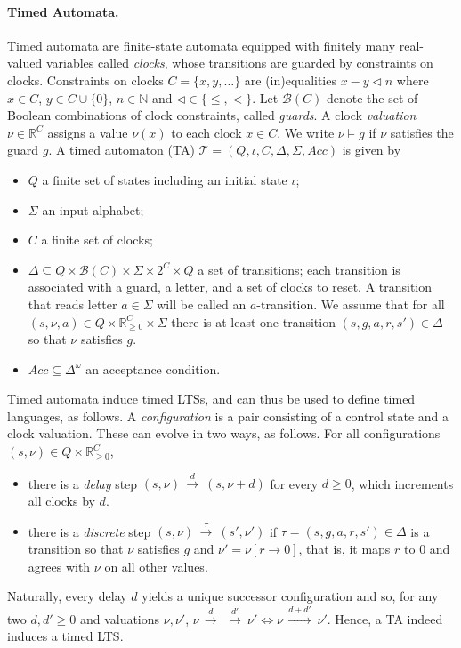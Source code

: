 \documentclass[10pt,a4paper]{amsart}
\theoremstyle{definition}
\numberwithin{equation}{section}
\newcommand{\R}{\mathbb{R}}
\newcommand{\nnreals}{{\mathbb R}_{\geq 0}}
\newcommand{\x}{\times}
\newcommand{\B}{\mathcal{B}}
\newcommand{\T}{\mathcal{T}}
\newcommand{\states}{Q}
\newcommand{\transitions}{\Delta}
\newcommand{\clocks}{C}
\newcommand{\valuations}{\nnreals^\clocks}
\newcommand{\acc}{\mathit{Acc}}
\newcommand{\TAtuple}{(\states,\iota,\clocks,\transitions,\Sigma,\acc)}
\newcommand{\step}[2][]{\Step{#2}{}{#1}}
\newcommand{\Step}[3]{\ensuremath{\,{\stackrel{#1}{\longrightarrow}}{}^{\scriptstyle{#2}}_{\scriptstyle{#3}}}\,}
\newcommand{\mypar}[1]{\paragraph*{#1.}}
\begin{document}
\medskip
\mypar{Timed Automata}
Timed automata are finite-state automata equipped with
finitely many real-valued variables called \emph{clocks}, whose transitions are guarded by constraints on clocks.
Constraints on clocks $\clocks=\{x,y,\ldots\}$ are (in)equalities $x-y \triangleleft n$ where $x\in \clocks$, $y\in \clocks\cup \{0\}$, $n\in \mathbb{N}$ and $\triangleleft \in \{\leq, <\}$. Let $\B(\clocks)$ denote the set of Boolean combinations of clock constraints, called \emph{guards}.
A clock \emph{valuation} $\nu\in \R^\clocks$ assigns a value $\nu(x)$ to each clock $x\in \clocks$. We write $\nu \models g$ if $\nu$ satisfies the guard $g$. 
A timed automaton (TA) $\T=\TAtuple$ is given by 
\begin{itemize}
\item $Q$ a finite set of states including an initial state $\iota$;
\item $\Sigma$ an input alphabet;
\item $\clocks$ a finite set of clocks;
\item $\transitions\subseteq Q\times \B(\clocks)\times \Sigma\times 2^\clocks \times Q$  a set of transitions; each transition is associated with a guard, a letter, and a set of clocks to reset. 
    A transition that reads letter $a\in\Sigma$ will be called an $a$-transition.
    We assume that %
    for all $(s,\nu,a)\in Q\x\valuations\x\Sigma$ there is at least one
    transition $(s,g,a,r,s')\in\transitions$
    so that $\nu$ satisfies $g$.
\item $\acc\subseteq \Delta^\omega$ an acceptance condition. 
\end{itemize}
Timed automata induce timed LTSs, and can thus be used to define timed languages, as follows.
A \emph{configuration} is a pair consisting of
a control state and a clock valuation.
These can evolve in two ways, as follows.
For all configurations $(s,\nu)\in \states\x\valuations$,
\begin{itemize}
    \item 
        there is a \emph{delay} step 
        $(s,\nu)\step{d}(s,\nu+d)$
        for every $d\ge0$, which increments all clocks by $d$.
    \item there is a \emph{discrete} step
        $(s,\nu)\step{\tau}(s',\nu')$ 
        if
        $\tau=(s,g,a,r,s')\in\transitions$
        is a transition so that $\nu$ satisfies $g$ and $\nu'=\nu[r\rightarrow 0]$, that is, it maps $r$ to $0$ and agrees with $\nu$ on all other values.
\end{itemize}
Naturally, every delay $d$ yields a unique successor configuration
and so, for any two $d,d'\ge 0$ and valuations $\nu,\nu'$,
$\nu\step{d}\step{d'}\nu'\iff\nu\step{d+d'}\nu'$.
Hence, a TA indeed induces a timed LTS.
\end{document}
